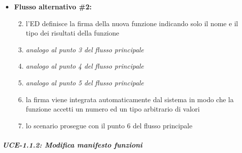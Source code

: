 \begin{itemize}
	\item \textbf{Flusso alternativo \#2:}
		\begin{enumerate}
			\setcounter{enumi}{1}
			\item l'ED definisce la firma della nuova funzione indicando solo il nome e il tipo dei risultati della funzione
			\item \emph{analogo al punto 3 del flusso principale}
			\item \emph{analogo al punto 4 del flusso principale}
			\item \emph{analogo al punto 5 del flusso principale}						
			\item la firma viene integrata automaticamente dal sistema in modo che la funzione accetti un numero ed un tipo arbitrario di valori
			\item lo scenario prosegue con il punto 6 del flusso principale
		\end{enumerate}

	
\end{itemize}


\subparagraph{UCE-1.1.2: Modifica manifesto funzioni} %

